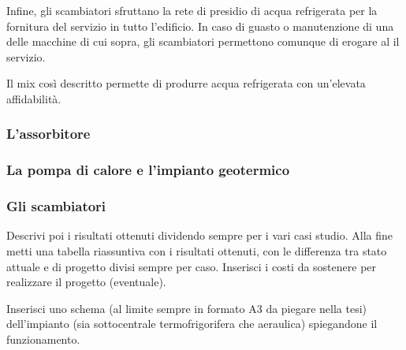 Infine, gli scambiatori sfruttano la rete di presidio di acqua refrigerata per la fornitura del servizio in tutto l'edificio. In caso di guasto o manutenzione di una delle macchine di cui sopra, gli scambiatori permettono comunque di erogare al  il servizio.

Il mix così descritto permette di produrre acqua refrigerata con un'elevata affidabilità.
\subsubsection{L'assorbitore}

\subsubsection{La pompa di calore e l'impianto geotermico}

\subsubsection{Gli scambiatori}



























\vspace{2cm}
Descrivi poi i risultati ottenuti dividendo sempre per i vari casi studio. Alla fine metti una tabella riassuntiva con i risultati ottenuti, con le differenza tra stato attuale e di progetto divisi sempre per caso. Inserisci i costi da sostenere per realizzare il progetto (eventuale).

Inserisci uno schema (al limite sempre in formato A3 da piegare nella tesi) dell'impianto (sia sottocentrale termofrigorifera che aeraulica) spiegandone il funzionamento.
